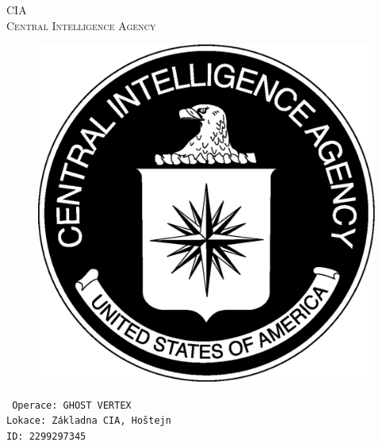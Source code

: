 \documentclass[a4paper, \fontheight]{article}
\begin{document}
	\begin{titlepage}
		\begin{center}		
			\textsc{{\fontsize{80}{0}\selectfont CIA}\\[2em]
				\Huge Central Intelligence Agency\\[2.5em]}
				
			\begin{figure}[H]
				\centering
				\includegraphics[scale=0.6]{sources/CIA_logo.eps}
			\end{figure}
		\end{center}	
		\vfill
		\noindent
		\texttt{\LARGE
				Operace: GHOST VERTEX\\[0.4em]
				Lokace: Základna CIA, Hoštejn\\[0.4em]
				ID: 2299297345}	
\end{titlepage} 
\end{document}
